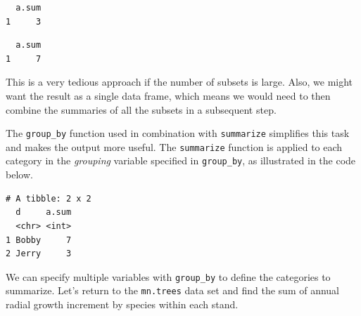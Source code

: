 \documentclass[]{krantz}
\makeatletter
\newenvironment{Shaded}{\begin{snugshade}}{\end{snugshade}}
\newcommand{\KeywordTok}[1]{\textcolor[rgb]{0.27,0.27,0.27}{\textbf{#1}}}
\newcommand{\DataTypeTok}[1]{\textcolor[rgb]{0.27,0.27,0.27}{#1}}
\newcommand{\StringTok}[1]{\textcolor[rgb]{0.5,0.5,0.5}{#1}}
\newcommand{\OperatorTok}[1]{\textcolor[rgb]{0.43,0.43,0.43}{\textbf{#1}}}
\newcommand{\NormalTok}[1]{#1}
\newenvironment{kframe}{%
\medskip{}
\setlength{\fboxsep}{.8em}
 \def\at@end@of@kframe{}%
 \ifinner\ifhmode%
  \def\at@end@of@kframe{\end{minipage}}%
  \begin{minipage}{\columnwidth}%
 \fi\fi%
 \def\FrameCommand##1{\hskip\@totalleftmargin \hskip-\fboxsep
 \colorbox{shadecolor}{##1}\hskip-\fboxsep
     \hskip-\linewidth \hskip-\@totalleftmargin \hskip\columnwidth}%
 \MakeFramed {\advance\hsize-\width
   \@totalleftmargin\z@ \linewidth\hsize
   \@setminipage}}%
 {\par\unskip\endMakeFramed%
 \at@end@of@kframe}
\renewenvironment{Shaded}{\begin{kframe}}{\end{kframe}}
\theoremstyle{definition}
\theoremstyle{definition}
\theoremstyle{definition}
\theoremstyle{remark}
\makeatother
\begin{document}
\begin{verbatim}
  a.sum
1     3
\end{verbatim}

\begin{Shaded}
\end{Shaded}

\begin{verbatim}
  a.sum
1     7
\end{verbatim}

This is a very tedious approach if the number of subsets is large. Also,
we might want the result as a single data frame, which means we would
need to then combine the summaries of all the subsets in a subsequent
step.

The \texttt{group\_by} function used in combination with
\texttt{summarize} simplifies this task and makes the output more
useful. The \texttt{summarize} function is applied to each category in
the \emph{grouping} variable specified in \texttt{group\_by}, as
illustrated in the code below.

\begin{Shaded}
\end{Shaded}

\begin{verbatim}
# A tibble: 2 x 2
  d     a.sum
  <chr> <int>
1 Bobby     7
2 Jerry     3
\end{verbatim}

We can specify multiple variables with \texttt{group\_by} to define the
categories to summarize. Let's return to the \texttt{mn.trees} data set
and find the sum of annual radial growth increment by species within
each stand.

\begin{Shaded}
\end{Shaded}
\end{document}
